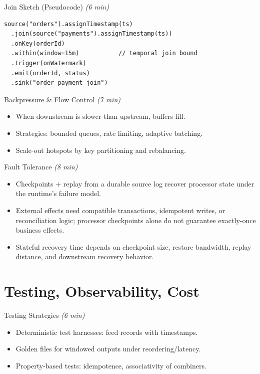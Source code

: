 \documentclass[aspectratio=169,11pt]{beamer}
\newcommand{\mins}[1]{\textit{(#1 min)}}
\begin{document}
\begin{frame}[fragile]{Join Sketch (Pseudocode) \mins{6}}
\begin{lstlisting}
source("orders").assignTimestamp(ts)
  .join(source("payments").assignTimestamp(ts))
  .onKey(orderId)
  .within(window=15m)           // temporal join bound
  .trigger(onWatermark)
  .emit(orderId, status)
  .sink("order_payment_join")
\end{lstlisting}
\end{frame}

\begin{frame}{Backpressure \& Flow Control \mins{7}}
  \begin{itemize}
    \item When downstream is slower than upstream, buffers fill.
    \item Strategies: bounded queues, rate limiting, adaptive batching.
    \item Scale-out hotspots by key partitioning and rebalancing.
  \end{itemize}
\end{frame}

\begin{frame}{Fault Tolerance \mins{8}}
  \begin{itemize}
    \item Checkpoints + replay from a durable source log recover processor state under the runtime's failure model.
    \item External effects need compatible transactions, idempotent writes, or reconciliation logic; processor checkpoints alone do not guarantee exactly-once business effects.
    \item Stateful recovery time depends on checkpoint size, restore bandwidth, replay distance, and downstream recovery behavior.
  \end{itemize}
\end{frame}

\section{Testing, Observability, Cost}
\begin{frame}{Testing Strategies \mins{6}}
  \begin{itemize}
    \item Deterministic test harnesses: feed records with timestamps.
    \item Golden files for windowed outputs under reordering/latency.
    \item Property-based tests: idempotence, associativity of combiners.
  \end{itemize}
\end{frame}
\end{document}

